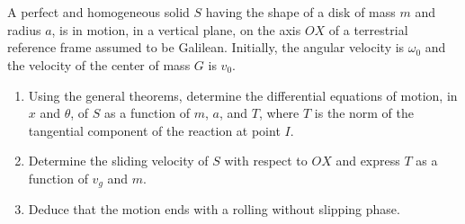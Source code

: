 \documentclass[12pt]{article}
\begin{document}
\section{}

A perfect and homogeneous solid $S$ having the shape of a disk of mass $m$ and radius $a$, is in motion, in a vertical plane, on the axis $OX$ of a terrestrial reference frame assumed to be Galilean. Initially, the angular velocity is $\omega_0$ and the velocity of the center of mass $G$ is $v_0$.

\begin{enumerate}
    \item Using the general theorems, determine the differential equations of motion, in $x$ and $\theta$, of $S$ as a function of $m$, $a$, and $T$, where $T$ is the norm of the tangential component of the reaction at point $I$.
    \item Determine the sliding velocity of $S$ with respect to $OX$ and express $T$ as a function of $v_g$ and $m$.
    \item Deduce that the motion ends with a rolling without slipping phase.
\end{enumerate}
\end{document}
